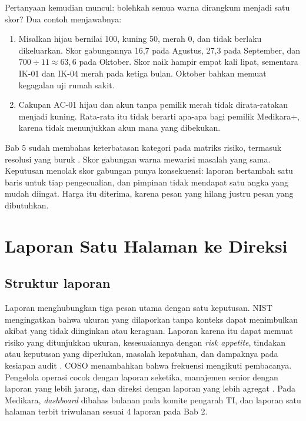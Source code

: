 Pertanyaan kemudian muncul: bolehkah semua warna dirangkum menjadi satu skor? Dua contoh
menjawabnya:
\begin{enumerate}
  \item Misalkan hijau bernilai 100, kuning 50, merah 0, dan tidak berlaku dikeluarkan. Skor
  gabungannya 16,7 pada Agustus, 27,3 pada September, dan $700 \div 11 \approx 63{,}6$ pada Oktober.
  Skor naik hampir empat kali lipat, sementara IK-01 dan IK-04 merah pada ketiga bulan. Oktober
  bahkan memuat kegagalan uji rumah sakit.
  \item Cakupan AC-01 hijau dan akun tanpa pemilik merah tidak dirata-ratakan menjadi kuning.
  Rata-rata itu tidak berarti apa-apa bagi pemilik Medikara+, karena tidak menunjukkan akun mana
  yang dibekukan.
\end{enumerate}

Bab 5 sudah membahas keterbatasan kategori pada matriks risiko, termasuk resolusi yang buruk
\cite{c05-cox2008}. Skor gabungan warna mewarisi masalah yang sama. Keputusan menolak skor gabungan
punya konsekuensi: laporan bertambah satu baris untuk tiap pengecualian, dan pimpinan tidak mendapat
satu angka yang mudah diingat. Harga itu diterima, karena pesan yang hilang justru pesan yang
dibutuhkan.

\section{Laporan Satu Halaman ke Direksi}

\subsection*{Struktur laporan}

Laporan menghubungkan tiga pesan utama dengan satu keputusan. NIST mengingatkan bahwa ukuran yang
dilaporkan tanpa konteks dapat menimbulkan akibat yang tidak diinginkan atau keraguan. Laporan
karena itu dapat memuat risiko yang ditunjukkan ukuran, kesesuaiannya dengan \textit{risk appetite},
tindakan atau keputusan yang diperlukan, masalah kepatuhan, dan dampaknya pada kesiapan audit
\cite{c13-nist80055v1}. COSO menambahkan bahwa frekuensi mengikuti pembacanya. Pengelola operasi
cocok dengan laporan seketika, manajemen senior dengan laporan yang lebih jarang, dan direksi dengan
laporan yang lebih agregat \cite{c13-coso-kri}. Pada Medikara, \textit{dashboard} dibahas bulanan
pada komite pengarah TI, dan laporan satu halaman terbit triwulanan sesuai 4 laporan pada Bab 2.

